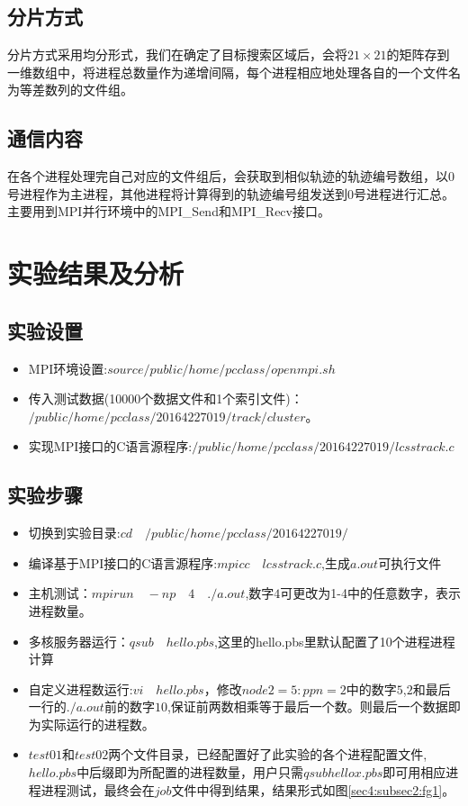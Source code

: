\documentclass[UTF8]{ctexart}
\begin{document}
\subsection{分片方式}

分片方式采用均分形式，我们在确定了目标搜索区域后，会将$21\times21$的矩阵存到一维数组中，将进程总数量作为递增间隔，每个进程相应地处理各自的一个文件名为等差数列的文件组。

\subsection{通信内容}

在各个进程处理完自己对应的文件组后，会获取到相似轨迹的轨迹编号数组，以0号进程作为主进程，其他进程将计算得到的轨迹编号组发送到0号进程进行汇总。
主要用到MPI并行环境中的MPI\_Send和MPI\_Recv接口。

\section{实验结果及分析}\label{sec4}

\subsection{实验设置}

\begin{itemize}
	\item MPI环境设置:$source /public/home/pcclass/openmpi.sh$
	\item 传入测试数据(10000个数据文件和1个索引文件)：$/public/home/pcclass/20164227019/track/cluster$。
	\item 实现MPI接口的C语言源程序:$/public/home/pcclass/20164227019/lcsstrack.c$
\end{itemize}

\subsection{实验步骤}
\label{sec4:subsec2}

\begin{itemize}
	\item 切换到实验目录:$cd \quad /public/home/pcclass/20164227019/$
	\item 编译基于MPI接口的C语言源程序:$mpicc \quad lcsstrack.c$,生成$a.out$可执行文件
	\item 主机测试：$mpirun \quad -np \quad 4 \quad ./a.out$,数字$4$可更改为1-4中的任意数字，表示进程数量。
	\item 多核服务器运行：$qsub \quad hello.pbs$,这里的hello.pbs里默认配置了10个进程进程计算
	\item 自定义进程数运行:$vi \quad hello.pbs$，修改$node2=5:ppn=2$中的数字$5$,$2$和最后一行的$./a.out$前的数字$10$,保证前两数相乘等于最后一个数。则最后一个数据即为实际运行的进程数。
	\item $test01$和$test02$两个文件目录，已经配置好了此实验的各个进程配置文件,$hello.pbs$中后缀即为所配置的进程数量，用户只需$qsub hellox.pbs$即可用相应进程进程测试，最终会在$job$文件中得到结果，结果形式如图\ref{sec4:subsec2:fg1}。
\end{itemize}
\end{document}
